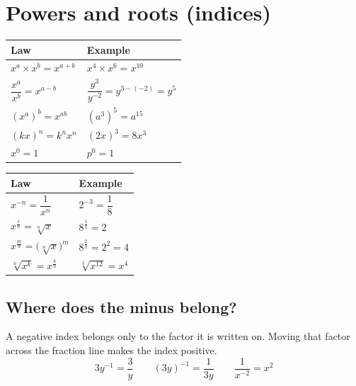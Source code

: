 \documentclass[11pt]{article}
\begin{document}
\section{Powers and roots (indices)}\label{h:indices}
\begin{minipage}[t]{0.5\textwidth}\vspace{0pt}
\renewcommand\arraystretch{1.55}
\begin{tabular}{@{}l l@{}}
\toprule
\textbf{Law} & \textbf{Example} \\ \midrule
$x^{a}\times x^{b} = x^{a+b}$ & $x^{4}\times x^{6} = x^{10}$ \\
$\dfrac{x^{a}}{x^{b}} = x^{a-b}$ & $\dfrac{y^{3}}{y^{-2}} = y^{3-(-2)} = y^{5}$ \\
$(x^{a})^{b} = x^{ab}$ & $(a^{3})^{5} = a^{15}$ \\
$(kx)^{n} = k^{n}x^{n}$ & $(2x)^{3} = 8x^{3}$ \\
$x^{0} = 1$ & $p^{0} = 1$ \\
\bottomrule
\end{tabular}
\end{minipage}\hfill
\begin{minipage}[t]{0.47\textwidth}\vspace{0pt}
\renewcommand\arraystretch{1.55}
\begin{tabular}{@{}l l@{}}
\toprule
\textbf{Law} & \textbf{Example} \\ \midrule
$x^{-n} = \dfrac{1}{x^{n}}$ & $2^{-3} = \dfrac{1}{8}$ \\
$x^{\frac{1}{n}} = \sqrt[n]{x}$ & $8^{\frac{1}{3}} = 2$ \\
$x^{\frac{m}{n}} = \bigl(\sqrt[n]{x}\bigr)^{m}$ & $8^{\frac{2}{3}} = 2^{2} = 4$ \\
$\sqrt[n]{x^{k}} = x^{\frac{k}{n}}$ & $\sqrt[3]{x^{12}} = x^{4}$ \\
\bottomrule
\end{tabular}
\end{minipage}

\subsection*{Where does the minus belong?}
A negative index belongs only to the factor it is written on. Moving that factor across the fraction line makes the index positive.
\[ 3y^{-1} = \frac{3}{y} \qquad (3y)^{-1} = \frac{1}{3y} \qquad \frac{1}{x^{-2}} = x^{2} \]
\end{document}
